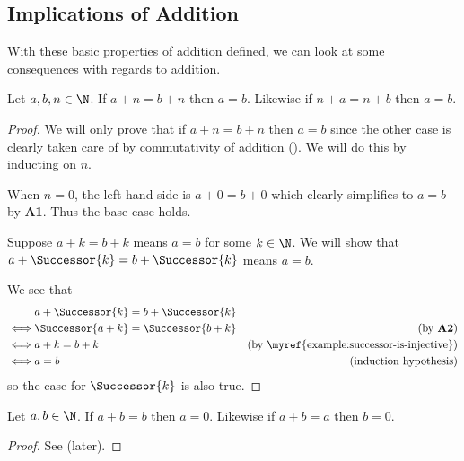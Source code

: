 \subsection{Implications of Addition}
With these basic properties of addition defined, we can look at some consequences with regards to addition.

\begin{proposition}\label{prop:addition-cancellation-property}
    Let $a, b, n \in \N$. If $a + n = b + n$ then $a = b$. Likewise if $n + a = n + b$ then $a = b$.
\end{proposition}
\begin{proof}
    We will only prove that if $a + n = b + n$ then $a = b$ since the other case is clearly taken care of by commutativity of addition (). We will do this by inducting on $n$.

    When $n = 0$, the left-hand side is $a + 0 = b + 0$ which clearly simplifies to $a = b$ by \textbf{A1}. Thus the base case holds.

    Suppose $a + k = b + k$ means $a = b$ for some $k \in \N$. We will show that $a + \Successor{k} = b + \Successor{k}$ means $a = b$.

    We see that
    \begin{align*}
        &a + \Successor{k} = b + \Successor{k}\\
        \iff& \Successor{a + k} = \Successor{b + k} & (\text{by \textbf{A2}})\\
        \iff& a + k = b + k & (\text{by \myref{example:successor-is-injective}})\\
        \iff& a = b &(\text{induction hypothesis})
    \end{align*}
    so the case for $\Successor{k}$ is also true.
\end{proof}

\begin{proposition}\label{prop:addition-that-equals-self}
    Let $a, b \in \N$. If $a + b = b$ then $a = 0$. Likewise if $a + b = a$ then $b = 0$.
\end{proposition}
\begin{proof}
    See  (later).
\end{proof}

